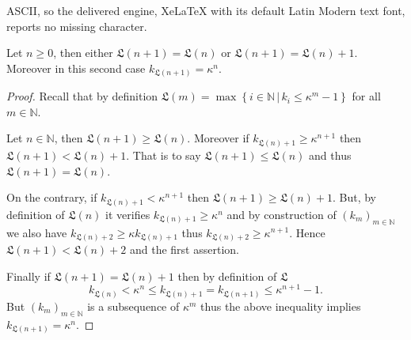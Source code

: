 \documentclass[10pt,a4paper]{amsart}
\newcommand{\Landing}{\mathfrak{L}}
\newcommand{\bN}{\mathbb{N}}
\begin{document}
ASCII, so the delivered engine, XeLaTeX with its default Latin Modern text font, reports no missing character.
\begin{Claim} \label{Claim:Landingnplusun}
  Let $n\geq 0$, then either $\Landing(n+1)=\Landing (n)$ or
  $\Landing(n+1)=\Landing (n)+1$. Moreover in this second case
  $k_{\Landing(n+1)}=\kappa^{n}$. 
\end{Claim}

\begin{proof} Recall that by definition $\Landing (m)=\max
  \left\{i\in \bN\, | \, k_i \leq \kappa^m-1 \right\}$ for all $m\in \bN$.

  Let
  $n\in \bN$, then $\Landing(n+1)\geq \Landing (n)$. Moreover if $k_{\Landing
    (n)+1}\geq \kappa^{n+1}$ then $\Landing(n+1)< \Landing(n)+1$. That is to say
  $\Landing(n+1)\leq \Landing(n)$ and thus $\Landing(n+1)=\Landing (n)$.

  On the contrary, if $k_{\Landing(n)+1}<\kappa^{n+1}$ then $\Landing(n+1)\geq
  \Landing (n)+1$. But, by definition of $\Landing (n)$ it verifies $k_{\Landing
    (n)+1}\geq \kappa^{n}$ and by 
  construction of $(k_m)_{m\in \bN}$ we also have $k_{\Landing(n)+2} \geq \kappa
  k_{\Landing (n)+1}$ thus $k_{\Landing(n)+2} \geq \kappa^{n+1}$. Hence
  $\Landing(n+1)<\Landing(n)+2 $ and the first assertion.

  Finally if $\Landing(n+1)=\Landing(n)+1$ then by definition of $\Landing$
  \begin{equation*}
    k_{\Landing(n)} < \kappa^n \leq k_{\Landing(n)+1}=k_{\Landing(n+1)} \leq \kappa^{n+1}-1.
  \end{equation*}
  But $(k_m)_{m\in \bN}$ is a subsequence of $\kappa^m$ thus the above
  inequality implies $k_{\Landing(n+1)}=\kappa^n$. 
\end{proof}
\end{document}
